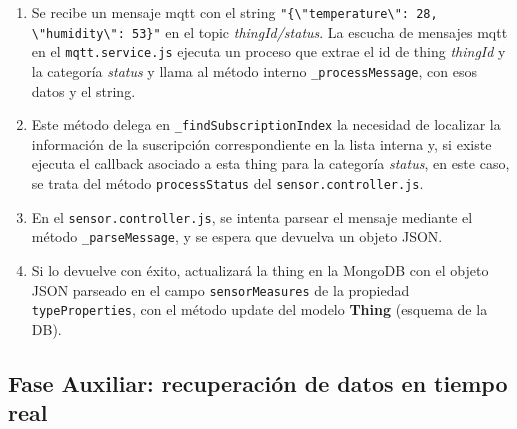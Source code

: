 \begin{enumerate}
\item  Se recibe un mensaje \gls{mqtt} con el string \verb|"{\"temperature\": 28, \"humidity\": 53}"| en el topic \textit{thingId/status}. La escucha de mensajes \gls{mqtt} en el \verb|mqtt.service.js| ejecuta un proceso que extrae el id de thing \textit{thingId} y la categoría \textit{status} y llama al método interno \verb|_processMessage|, con esos datos y el string.

\item  Este método delega en \verb|_findSubscriptionIndex| la necesidad de localizar la información de la suscripción correspondiente en la lista interna y, si existe ejecuta el callback asociado a esta thing para la categoría \textit{status}, en este caso, se trata del método \verb|processStatus| del \verb|sensor.controller.js|.

\item  En el \verb|sensor.controller.js|, se intenta parsear el mensaje mediante el método \verb|_parseMessage|, y se espera que devuelva un objeto JSON.

\item  Si lo devuelve con éxito, actualizará la thing en la MongoDB con el objeto JSON parseado en el campo \verb|sensorMeasures| de la propiedad \verb|typeProperties|, con el método update del modelo \textbf{Thing} (esquema de la DB).
\end{enumerate}

\subsection{Fase Auxiliar: recuperación de datos en tiempo real}
\label{ch:Capitulo5.4.3}
